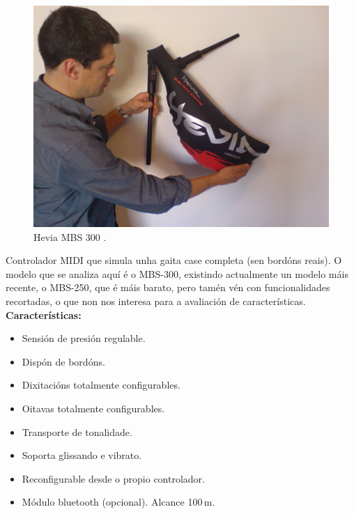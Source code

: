   \begin{figure}[htbp]
   \centering
   \includegraphics[scale=0.1,keepaspectratio=true]{./imagenes/hevia-mbs-300.jpg}
   \caption[Hevia MBS 300]{Hevia MBS 300 \cite{HeviaMBS300}.}
   \label{figura:HeviaMBS300}
  \end{figure}

  Controlador MIDI que simula unha gaita case completa (sen bordóns reais). O
  modelo que se analiza aquí é o MBS-300, existindo actualmente un modelo máis
  recente, o MBS-250, que é máis barato, pero tamén vén con funcionalidades
  recortadas, o que non nos interesa para a avaliación de características. \\

  \textbf{Características:}

  \begin{itemize}
   \item Sensión de presión regulable.
   \item Dispón de bordóns.
   \item Dixitacións totalmente configurables.
   \item Oitavas totalmente configurables.
   \item Transporte de tonalidade.
   \item Soporta glissando e vibrato.
   \item Reconfigurable desde o propio controlador.
   \item Módulo bluetooth (opcional). Alcance 100\,m.
  \end{itemize}

